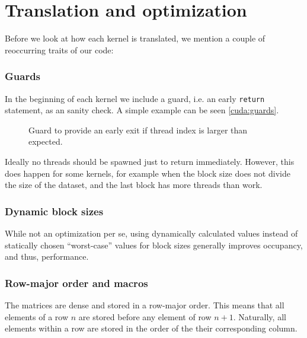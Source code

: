 
\section{Translation and optimization}

Before we look at how each kernel is translated, we mention a couple of
reoccurring traits of our code:

\subsubsection{Guards} In the beginning of each kernel we include a guard, i.e.
an early \texttt{return} statement, as an sanity check. A simple example can be
seen \autoref{cuda:guards}.

\begin{figure}[H]
    \centering
    \caption{Guard to provide an early exit if thread index is larger than expected.}
    \label{cuda:guards}
\end{figure}

Ideally no threads should be spawned just to return immediately. However, this
does happen for some kernels, for example when the block size does not divide
the size of the dataset, and the last block has more threads than work.

\subsubsection{Dynamic block sizes}
While not an optimization per se, using dynamically calculated values instead
of statically chosen \enquote{worst-case} values for block sizes generally
improves occupancy, and thus, performance.


\subsubsection{Row-major order and macros}
The matrices are dense and stored in a row-major order.
This means that all elements of a row \(n\) are stored before any element of
row \(n+1\).
Naturally, all elements within a row are stored in the order of the their
corresponding column.


